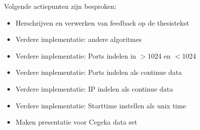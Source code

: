 \documentclass[notitlepage]{article}
\begin{document}
Volgende actiepunten zijn besproken:
\begin{itemize}  		
		\item Herschrijven en verwerken van feedback op de thesistekst 
        \item Verdere implementatie: andere algoritmes
        \item Verdere implementatie: Ports indelen in $>$1024 en $<$1024
        \item Verdere implementatie: Ports indelen als continue data
        \item Verdere implementatie: IP indelen als continue data
        \item Verdere implementatie: Starttime instellen als unix time
        \item Maken presentatie voor Cegeka data set
\end{itemize}
\end{document}
